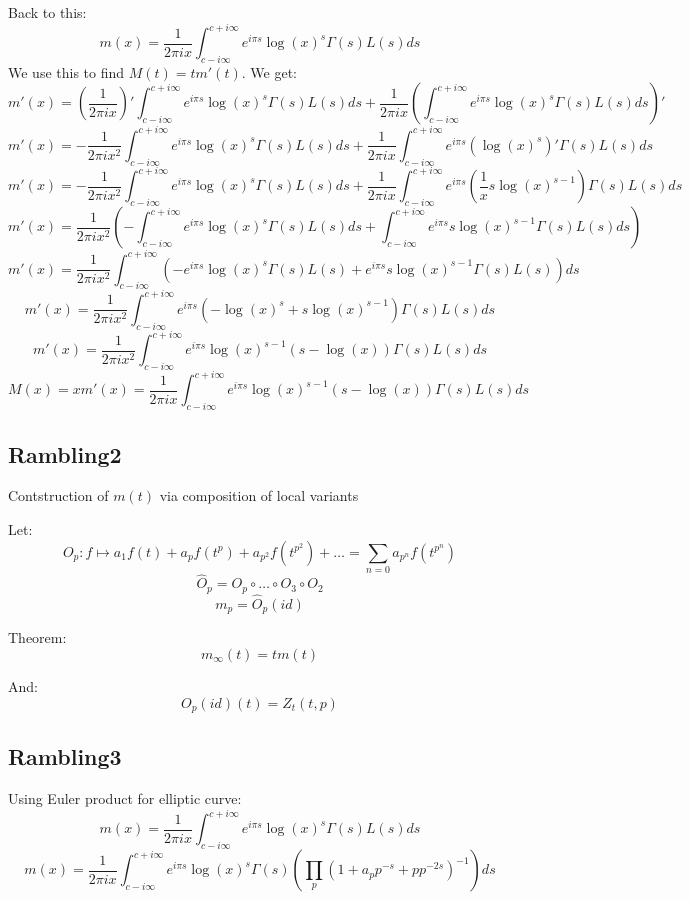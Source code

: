 \documentclass[a4paper]{amsart}
\begin{document}
Back to this:
$$m(x) = \frac{1}{2\pi i x} \int_{c - i\infty}^{c + i\infty}e^{i\pi s}\log(x)^s \Gamma(s)L(s)ds$$
We use this to find $M(t) = t m'(t)$. We get:
$$m'(x) = \left(\frac{1}{2\pi i x}\right)' \int_{c - i\infty}^{c + i\infty}e^{i\pi s}\log(x)^s \Gamma(s)L(s)ds + \frac{1}{2\pi i x} \left(\int_{c - i\infty}^{c + i\infty}e^{i\pi s}\log(x)^s \Gamma(s)L(s)ds\right)'$$
$$m'(x) = -\frac{1}{2\pi i x^2} \int_{c - i\infty}^{c + i\infty}e^{i\pi s}\log(x)^s \Gamma(s)L(s)ds + \frac{1}{2\pi i x} \int_{c - i\infty}^{c + i\infty}e^{i\pi s}\left(\log(x)^s\right)' \Gamma(s)L(s)ds$$
$$m'(x) = -\frac{1}{2\pi i x^2} \int_{c - i\infty}^{c + i\infty}e^{i\pi s}\log(x)^s \Gamma(s)L(s)ds + \frac{1}{2\pi i x} \int_{c - i\infty}^{c + i\infty}e^{i\pi s}\left(\frac{1}{x}s\log(x)^{s-1}\right) \Gamma(s)L(s)ds$$
$$m'(x) = \frac{1}{2\pi i x^2}\left(-\int_{c - i\infty}^{c + i\infty}e^{i\pi s}\log(x)^s \Gamma(s)L(s)ds + \int_{c - i\infty}^{c + i\infty}e^{i\pi s}s\log(x)^{s-1} \Gamma(s)L(s)ds\right)$$
$$m'(x) = \frac{1}{2\pi i x^2}\int_{c - i\infty}^{c + i\infty}\left(-e^{i\pi s}\log(x)^s \Gamma(s)L(s) + e^{i\pi s}s\log(x)^{s-1} \Gamma(s)L(s)\right)ds$$
$$m'(x) = \frac{1}{2\pi i x^2}\int_{c - i\infty}^{c + i\infty}e^{i\pi s}\left(-\log(x)^s + s\log(x)^{s-1}\right) \Gamma(s)L(s)ds$$
$$m'(x) = \frac{1}{2\pi i x^2}\int_{c - i\infty}^{c + i\infty}e^{i\pi s}\log(x)^{s - 1}(s-\log(x)) \Gamma(s)L(s)ds$$
$$M(x) = xm'(x) = \frac{1}{2\pi i x}\int_{c - i\infty}^{c + i\infty}e^{i\pi s}\log(x)^{s - 1}(s-\log(x)) \Gamma(s)L(s)ds$$



\subsection{Rambling2}
Contstruction of $m(t)$ via composition of local variants 

Let:
$$O_p : f \mapsto a_1f(t) + a_pf(t^p) + a_{p^2}f(t^{p^2}) + \ldots = \sum_{n = 0} a_{p^n}f(t^{p^n})$$
$$\hat{O}_p = O_p \circ \ldots \circ O_3 \circ O_2$$
$$m_p = \hat{O}_p(id)$$

Theorem:
$$m_{\infty}(t) = t m(t)$$

And:
$$O_p(id)(t) = Z_t(t, p)$$

\subsection{Rambling3}
Using Euler product for elliptic curve:
$$m(x) = \frac{1}{2\pi i x} \int_{c - i\infty}^{c + i\infty}e^{i\pi s}\log(x)^s \Gamma(s)L(s)ds$$
$$m(x) = \frac{1}{2\pi i x} \int_{c - i\infty}^{c + i\infty}e^{i\pi s}\log(x)^s \Gamma(s)\left(\prod_p (1 + a_p p^{-s} + p p^{-2s})^{-1}\right)ds$$
\end{document}
